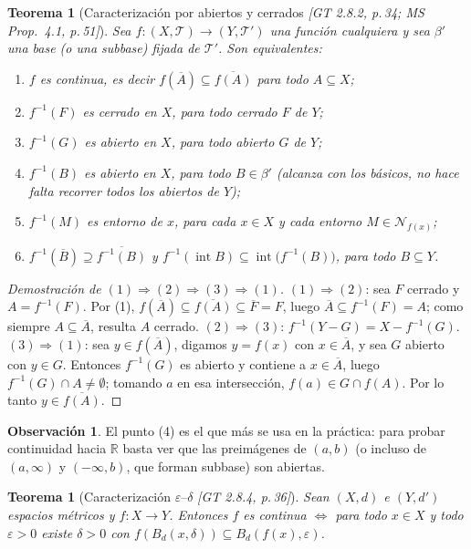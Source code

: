 \documentclass[11pt,a4paper]{article}
\theoremstyle{definition}
\newtheorem{observacion}[definicion]{Observación}
\theoremstyle{plain}
\newtheorem{teorema}[definicion]{Teorema}
\newcommand{\fnt}[1]{{\normalfont\small\itshape\color{gray!150!black}[#1]}}
\newcommand{\R}{\mathbb{R}}
\newcommand{\cl}[1]{\overline{#1}}
\newcommand{\intr}{\operatorname{int}}
\newcommand{\Bola}[2]{B_d(#1,#2)}
\newcommand{\tp}{\mathcal{T}}
\begin{document}
\begin{teorema}[Caracterización por abiertos y cerrados \fnt{GT 2.8.2, p.\,34; MS Prop.\ 4.1, p.\,51}]\label{th:contab}
Sea $f:(X,\tp)\to(Y,\tp')$ una función cualquiera y sea $\beta'$ una base (o una subbase) fijada de $\tp'$. Son equivalentes:
\begin{enumerate}[label=(\arabic*),leftmargin=2.2em,itemsep=0pt]
\item $f$ es continua, es decir $f(\cl A)\subseteq\cl{f(A)}$ para todo $A\subseteq X$;
\item $f^{-1}(F)$ es cerrado en $X$, para todo cerrado $F$ de $Y$;
\item $f^{-1}(G)$ es abierto en $X$, para todo abierto $G$ de $Y$;
\item $f^{-1}(B)$ es abierto en $X$, para todo $B\in\beta'$ (alcanza con los \emph{básicos}, no hace falta recorrer todos los abiertos de $Y$);
\item $f^{-1}(M)$ es entorno de $x$, para cada $x\in X$ y cada entorno $M\in\mathcal N_{f(x)}$;
\item $f^{-1}(\cl B)\supseteq \cl{f^{-1}(B)}$ y $f^{-1}(\intr B)\subseteq \intr\big(f^{-1}(B)\big)$, para todo $B\subseteq Y$.
\end{enumerate}
\end{teorema}

\begin{proof}[Demostración de $(1)\Rightarrow(2)\Rightarrow(3)\Rightarrow(1)$]
$(1)\Rightarrow(2)$: sea $F$ cerrado y $A=f^{-1}(F)$. Por (1), $f(\cl{A})\subseteq\cl{f(A)}\subseteq \cl F=F$, luego $\cl A\subseteq f^{-1}(F)=A$; como siempre $A\subseteq\cl A$, resulta $A$ cerrado.
$(2)\Rightarrow(3)$: $f^{-1}(Y-G)=X-f^{-1}(G)$.
$(3)\Rightarrow(1)$: sea $y\in f(\cl A)$, digamos $y=f(x)$ con $x\in\cl A$, y sea $G$ abierto con $y\in G$. Entonces $f^{-1}(G)$ es abierto y contiene a $x\in \cl A$, luego $f^{-1}(G)\cap A\ne\emptyset$; tomando $a$ en esa intersección, $f(a)\in G\cap f(A)$. Por lo tanto $y\in\cl{f(A)}$.
\end{proof}

\begin{observacion}
El punto (4) es el que más se usa en la práctica: para probar continuidad hacia $\R$ basta ver que las preimágenes de $(a,b)$ (o incluso de $(a,\infty)$ y $(-\infty,b)$, que forman subbase) son abiertas.
\end{observacion}

\begin{teorema}[Caracterización $\varepsilon$--$\delta$ \fnt{GT 2.8.4, p.\,36}]
Sean $(X,d)$ e $(Y,d')$ espacios métricos y $f:X\to Y$. Entonces $f$ es continua $\iff$ para todo $x\in X$ y todo $\varepsilon>0$ existe $\delta>0$ con $f(\Bola{x}{\delta})\subseteq \Bola{f(x)}{\varepsilon}$.
\end{teorema}
\end{document}
